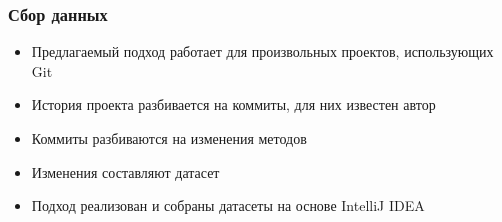 \documentclass[xcolor=table]{beamer}
\begin{document}
\begin{frame}
	\frametitle{Сбор данных}
	\begin{itemize}
		\item Предлагаемый подход работает для произвольных проектов, использующих Git
		\item История проекта разбивается на коммиты, для них известен автор
		\item Коммиты разбиваются на изменения методов
		\item Изменения составляют датасет
		\item Подход реализован и собраны датасеты на основе IntelliJ IDEA
	\end{itemize}
\end{frame}
\end{document}
